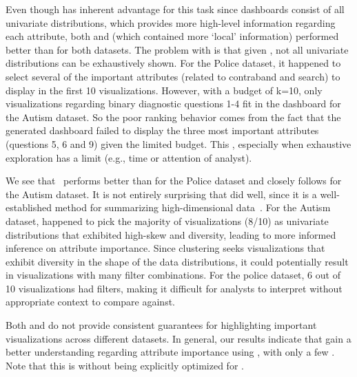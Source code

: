 \par Even though \BFS has  inherent advantage for this task since \BFS dashboards consist of all univariate distributions, which provides more high-level information regarding each attribute, both \system and \cluster (which contained more `local' information) performed better than \BFS for both datasets. The problem with \BFS is that given , not all univariate distributions can be exhaustively shown. For the Police dataset, it happened to select several of the important attributes (related to contraband and search) to display in the first 10 visualizations. However, with a budget of k=10, only visualizations regarding binary diagnostic questions 1-4 fit in the dashboard for the Autism dataset. So the poor ranking behavior comes from the fact that the \BFS generated dashboard failed to display the three most important attributes (questions 5, 6 and 9) given the limited budget. This , especially when exhaustive exploration has a limit (e.g., time or attention of analyst).
\par We see that \system\ performs better than \cluster for the Police dataset and closely follows \cluster for the Autism dataset. It is not entirely surprising that \cluster did well, since it is a well-established method for summarizing high-dimensional data~\cite{Han2005}. For the Autism dataset, \cluster happened to pick the majority of visualizations (8/10) as univariate distributions that exhibited high-skew and diversity, leading to more informed inference on attribute importance. Since clustering seeks visualizations that exhibit diversity in the shape of the data distributions, it could potentially result in visualizations with many filter combinations. For the police dataset, 6 out of 10 visualizations had  filters, making it difficult for analysts to interpret  without appropriate context to compare against.
\par Both \BFS and \cluster do not provide consistent guarantees for highlighting important visualizations across different datasets. In general, our results indicate that  gain a better  understanding regarding attribute importance using \system, with only a few . Note that this is without \system being explicitly optimized for .
